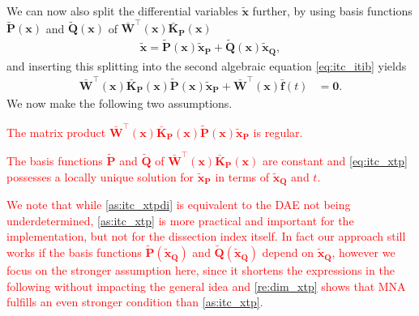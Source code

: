 \documentclass[AMA,STIX1COL]{WileyNJD-v2}
\newcommand{\mb}[1]{\mathbf{#1}}
\newcommand{\mbt}[1]{\tilde{\mathbf{#1}}}
\newcommand{\mbb}[1]{\bar{\mathbf{#1}}}
\newcommand{\T}{{\!\top}}
\begin{document}
We can now also split the differential variables $\mbt{x}$ further, by using basis functions $\mbt{P}(\mb{x})$ and $\mbt{Q}(\mb{x})$ of $\mbb{W}^\T (\mb{x}) \mbb{K}_\mb{P}(\mb{x})$
\begin{align}
    \mbt{x} = \mbt{P}(\mb{x}) \mbt{x}_\mb{P} +
    \mbt{Q}(\mb{x}) \mbt{x}_\mb{Q}, \label{eq:itc_xt}
\end{align}
and inserting this splitting into the second algebraic equation \eqref{eq:itc_itib} yields
\begin{align}
    \mbb{W}^\T (\mb{x}) \mbb{K}_\mb{P}(\mb{x}) \mbt{P}(\mb{x}) \mbt{x}_\mb{P} + \mbb{W}^\T (\mb{x}) \mbb{f}(t) &= \mb{0}. \label{eq:itc_xtp}
\end{align}
We now make the following two assumptions.
\textcolor{red}{\begin{assumption}
    \label{as:itc_xtpdi}
    The matrix product $\mbb{W}^\T (\mb{x}) \mbb{K}_\mb{P}(\mb{x}) \mbt{P}(\mb{x}) \mbt{x}_\mb{P}$ is regular.
\end{assumption}
\begin{assumption}
    \label{as:itc_xtp}
    The basis functions $\mbt{P}$ and $\mbt{Q}$ of $\mbb{W}^\T (\mb{x}) \mbb{K}_\mb{P}(\mb{x})$ are constant and \eqref{eq:itc_xtp} possesses a locally unique solution for $\mbt{x}_\mb{P}$ in terms of $\mbt{x}_\mb{Q}$ and $t$.
\end{assumption}
We note that while \autoref{as:itc_xtpdi} is equivalent to the DAE not being underdetermined\cite{jansen2014}, \autoref{as:itc_xtp} is more practical and important for the implementation, but not for the dissection index itself. In fact our approach still works if the basis functions $\mbt{P}(\mbt{x}_\mb{Q})$ and $\mbt{Q}(\mbt{x}_\mb{Q})$ depend on $\mbt{x}_\mb{Q}$, however we focus on the stronger assumption here, since it shortens the expressions in the following without impacting the general idea and \autoref{re:dim_xtp} shows that MNA fulfills an even stronger condition than \autoref{as:itc_xtp}.}
\end{document}
